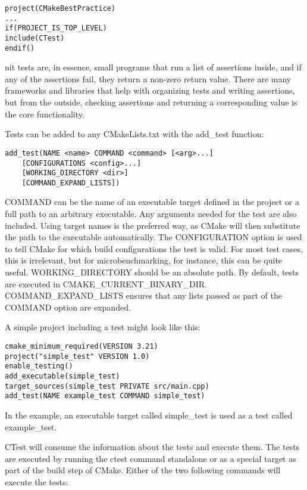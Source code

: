 \begin{lstlisting}[style=styleCMake]
project(CMakeBestPractice)
...
if(PROJECT_IS_TOP_LEVEL)
include(CTest)
endif()
\end{lstlisting}

nit tests are, in essence, small programs that run a list of assertions inside, and if any of the assertions fail, they return a non-zero return value. There are many frameworks and libraries that help with organizing tests and writing assertions, but from the outside, checking assertions and returning a corresponding value is the core functionality.

Tests can be added to any CMakeLists.txt with the add\_test function:

\begin{lstlisting}[style=styleCMake]
add_test(NAME <name> COMMAND <command> [<arg>...]
	[CONFIGURATIONS <config>...]
	[WORKING_DIRECTORY <dir>]
	[COMMAND_EXPAND_LISTS])
\end{lstlisting}

COMMAND can be the name of an executable target defined in the project or a full path to an arbitrary executable. Any arguments needed for the test are also included. Using target names is the preferred way, as CMake will then substitute the path to the executable automatically. The CONFIGURATION option is used to tell CMake for which build configurations the test is valid. For most test cases, this is irrelevant, but for microbenchmarking, for instance, this can be quite useful. WORKING\_DIRECTORY should be an absolute path. By default, tests are executed in CMAKE\_CURRENT\_BINARY\_DIR. COMMAND\_EXPAND\_LISTS ensures that any lists passed as part of the COMMAND option are expanded.

A simple project including a test might look like this:

\begin{lstlisting}[style=styleCMake]
cmake_minimum_required(VERSION 3.21)
project("simple_test" VERSION 1.0)
enable_testing()
add_executable(simple_test)
target_sources(simple_test PRIVATE src/main.cpp)
add_test(NAME example_test COMMAND simple_test)
\end{lstlisting}

In the example, an executable target called simple\_test is used as a test called example\_test.

CTest will consume the information about the tests and execute them. The tests are executed by running the ctest command standalone or as a special target as part of the build step of CMake. Either of the two following commands will execute the tests:

